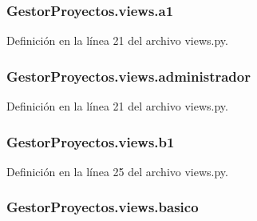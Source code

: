 \subsubsection[{\texorpdfstring{a1}{a1}}]{\setlength{\rightskip}{0pt plus 5cm}Gestor\+Proyectos.\+views.\+a1}\hypertarget{namespace_gestor_proyectos_1_1views_a6ed4d1f93d4bb9889e969822bb0b3be0}{}\label{namespace_gestor_proyectos_1_1views_a6ed4d1f93d4bb9889e969822bb0b3be0}


Definición en la línea 21 del archivo views.\+py.

\subsubsection[{\texorpdfstring{administrador}{administrador}}]{\setlength{\rightskip}{0pt plus 5cm}Gestor\+Proyectos.\+views.\+administrador}\hypertarget{namespace_gestor_proyectos_1_1views_a7c4f590daee33e8a960d99b904dd4a96}{}\label{namespace_gestor_proyectos_1_1views_a7c4f590daee33e8a960d99b904dd4a96}


Definición en la línea 21 del archivo views.\+py.

\subsubsection[{\texorpdfstring{b1}{b1}}]{\setlength{\rightskip}{0pt plus 5cm}Gestor\+Proyectos.\+views.\+b1}\hypertarget{namespace_gestor_proyectos_1_1views_a8d142097795d217c05e793c1df8124a3}{}\label{namespace_gestor_proyectos_1_1views_a8d142097795d217c05e793c1df8124a3}


Definición en la línea 25 del archivo views.\+py.

\subsubsection[{\texorpdfstring{basico}{basico}}]{\setlength{\rightskip}{0pt plus 5cm}Gestor\+Proyectos.\+views.\+basico}\hypertarget{namespace_gestor_proyectos_1_1views_a94f792d3d392f6d3d158853d4446812c}{}\label{namespace_gestor_proyectos_1_1views_a94f792d3d392f6d3d158853d4446812c}


